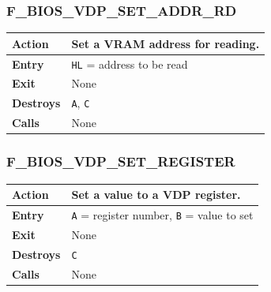 \documentclass[a4paper,11pt]{article}
\begin{document}
        \subsubsection{F\_BIOS\_VDP\_SET\_ADDR\_RD}
        \label{func:fbiosvdpsetaddrrd}
        \begin{tabular}{l p{9cm}}
            \hline\textbf{Action}
            & Set a \textbf{VRAM} address for reading. \\
            \hline\textbf{Entry} & \texttt{HL} = address to be read\\
            \hline\textbf{Exit} & None\\
            \hline\textbf{Destroys} & \texttt{A}, \texttt{C} \\
            \hline\textbf{Calls} & None\\
            \hline
        \end{tabular}

        \subsubsection{F\_BIOS\_VDP\_SET\_REGISTER}
        \label{func:fbiosvdpsetregister}
        \begin{tabular}{l p{9cm}}
            \hline\textbf{Action}
            & Set a value to a \textbf{VDP} register. \\
            \hline\textbf{Entry} & \texttt{A} = register number, \texttt{B} =
            value to set\\
            \hline\textbf{Exit} & None\\
            \hline\textbf{Destroys} & \texttt{C} \\
            \hline\textbf{Calls} & None\\
            \hline
        \end{tabular}

\end{document}
